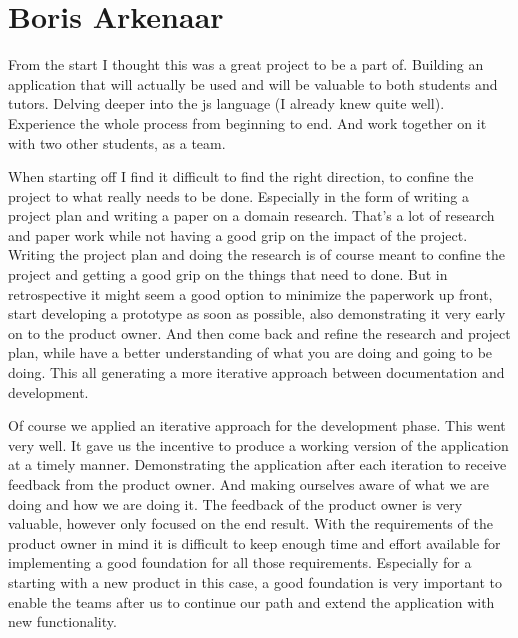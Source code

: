 
\section{Boris Arkenaar}
From the start I thought this was a great project to be a part of.
Building an application that will actually be used
and will be valuable to both \glspl{student} and \glspl{tutor}.
Delving deeper into the \gls{js} language (I already knew quite well).
Experience the whole process from beginning to end.
And work together on it with two other students, as a team.

When starting off I find it difficult to find the right direction,
to confine the project to what really needs to be done.
Especially in the form of writing a project plan
and writing a paper on a domain research.
That's a lot of research and paper work
while not having a good grip on the impact of the project.
Writing the project plan and doing the research
is of course meant to confine the project
and getting a good grip on the things that need to done.
But in retrospective it might seem a good option
to minimize the paperwork up front,
start developing a prototype as soon as possible,
also demonstrating it very early on to the product owner.
And then come back and refine the research and project plan,
while have a better understanding of what you are doing
and going to be doing.
This all generating a more iterative approach
between documentation and development.

Of course we applied an iterative approach for the development phase.
This went very well.
It gave us the incentive to produce a working version of the application
at a timely manner.
Demonstrating the application after each iteration
to receive feedback from the product owner.
And making ourselves aware of what we are doing
and how we are doing it.
The feedback of the product owner is very valuable,
however only focused on the end result.
With the requirements of the product owner in mind
it is difficult to keep enough time and effort available
for implementing a good foundation for all those requirements.
Especially for a starting with a new product in this case,
a good foundation is very important
to enable the teams after us to continue our path
and extend the application with new functionality.

